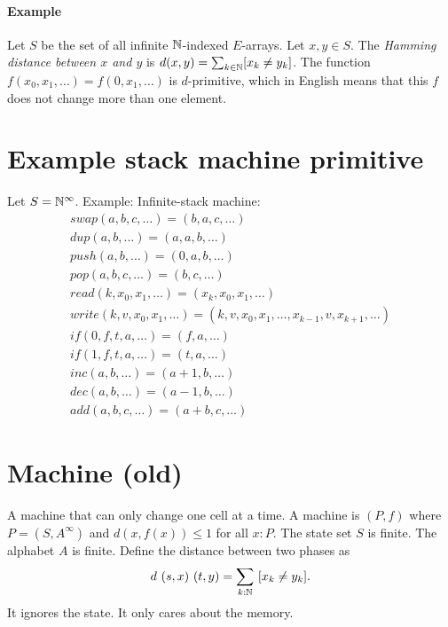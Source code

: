 \paragraph{Example}
Let \(S\) be the set of all infinite \(\mathbb{N}\)-indexed \(E\)-arrays.
Let \(x,y \in S\).
The \emph{Hamming distance between \(x\) and \(y\)} is
\(d(x,y) = \sum_{k\in\mathbb{N}} [x_k \neq y_k]\).
The function \(f(x_0,x_1,\ldots) = f(0,x_1,\ldots)\) is \(d\)-primitive,
which in English means that this \(f\) does not change more than one element.

\section{Example stack machine primitive}

Let \(S = \mathbb{N}^\infty\).
Example:
Infinite-stack machine:
\begin{align*}
    swap(a,b,c,\ldots) = (b,a,c,\ldots)
    \\
    dup(a,b,\ldots) = (a,a,b,\ldots)
    \\
    push(a,b,\ldots) = (0,a,b,\ldots)
    \\
    pop(a,b,c,\ldots) = (b,c,\ldots)
    \\
    read(k,x_0,x_1,\ldots) = (x_k,x_0,x_1,\ldots)
    \\
    write(k,v,x_0,x_1,\ldots) = (k,v,x_0,x_1,\ldots,x_{k-1},v,x_{k+1},\ldots)
    \\
    if(0,f,t,a,\ldots) = (f,a,\ldots)
    \\
    if(1,f,t,a,\ldots) = (t,a,\ldots)
    \\
    inc(a,b,\ldots) = (a+1,b,\ldots)
    \\
    dec(a,b,\ldots) = (a-1,b,\ldots)
    \\
    add(a,b,c,\ldots) = (a+b,c,\ldots)
\end{align*}

\section{Machine (old)}

A machine that can only change one cell at a time.
A machine is
\((P, f)\)
where \(P = (S,A^\infty)\)
and
\(d(x,f(x)) \le 1\)
for all \(x : P\).
The state set \(S\) is finite.
The alphabet \(A\) is finite.
Define the distance between two phases as
\begin{align}
    d~(s,x)~(t,y) = \sum_{k : \mathbb{N}} ~ [x_k \neq y_k].
\end{align}
It ignores the state.
It only cares about the memory.

